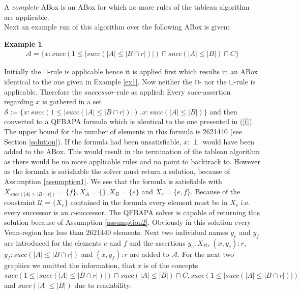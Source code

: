 \documentclass{book}
\theoremstyle{break}
\theoremstyle{definition}
\newtheorem{ex}{Example}
\begin{document}
A \textit{complete} ABox is an ABox for which no more rules of the tableau algorithm are applicable.\\
Next an example run of this algorithm over the following ABox is given:
\begin{ex}
\begin{align*}
\mathcal{A}=\{x:succ(1\leq|succ(|A|\leq|B\cap r|)|)\sqcap succ(|A|\leq |B|)\sqcap C\}
\end{align*}
\end{ex}
Initially the $\sqcap$-rule is applicable hence it is applied first which results in an ABox identical to the one given in Example \ref{ex1}. Now neither the $\sqcap$- nor the $\sqcup$-rule is applicable. Therefore the $successor$-rule as applied: Every $succ$-assertion regarding $x$ is gathered in a set $\mathcal{S}:=\{x:succ(1\leq|succ(|A|\leq|B\cap r|)|), x:succ(|A|\leq |B|)\}$ and then converted to a QFBAPA formula which is identical to the one presented in (\ref{f}). The upper bound for the number of elements in this formula is 2621440 (see Section \ref{solution}). If the formula had been unsatisfiable, $x:\perp$ would have been added to the ABox. This would result in the termination of the tableau algorithm as there would be no more applicable rules and no point to backtrack to. However as the formula is satisfiable the solver must return a solution, because of Assumption \ref{assumption1}. We see that the formula is satisfiable with $X_{succ(|A|\leq |B\cap r|)}=\{f\},X_A=\{\},X_B=\{e\}$ and $X_r=\{e,f\}$. Because of the constraint $\mathcal{U}=\{X_r\}$ contained in the formula every element must be in $X_r$ i.e. every successor is an $r$-successor. The QFBAPA solver is capable of returning this solution because of Assumption \ref{assumption2}. Obviously in this solution every Venn-region has less than 2621440 elements. Next two individual names $y_e$ and $y_f$ are introduced for the elements $e$ and $f$ and the assertions $y_e:X_B$, $(x,y_e):r$, $y_f:succ(|A|\leq|B\cap r|)$ and $(x,y_f):r$ are added to $\mathcal{A}$. For the next two graphics we omitted the information, that $x$ is of the concepts $succ(1\leq|succ(|A|\leq|B\cap r|)|)\sqcap succ(|A|\leq |B|)\sqcap C, succ(1\leq|succ(|A|\leq|B\cap r|)|)$ and $succ(|A|\leq |B|)$ due to readability:
\begin{figure}[H]
\centering
{}
\end{figure}
\end{document}
